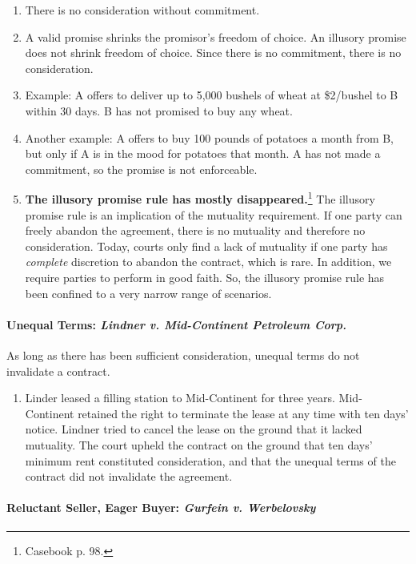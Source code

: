 \begin{enumerate}
    \item There is no consideration without commitment.
    \item A valid promise shrinks the promisor's freedom of choice. An 
    illusory promise does not shrink freedom of choice. Since there is no 
    commitment, there is no consideration.
    \item Example: A offers to deliver up to 5,000 bushels of wheat at 
    \$2/bushel to B within 30 days. B has not promised to buy any wheat.
    \item Another example: A offers to buy 100 pounds of potatoes a month from 
    B, but only if A is in the mood for potatoes that month. A has not made a 
    commitment, so the promise is not enforceable.
    \item \textbf{The illusory promise rule has mostly 
    disappeared.}\footnote{Casebook p. 98.} The illusory promise rule is an 
    implication of the mutuality requirement. If one party can freely abandon 
    the agreement, there is no mutuality and therefore no consideration. 
    Today, courts only find a lack of mutuality if one party has 
    \emph{complete} discretion to abandon the contract, which is rare. In 
    addition, we require parties to perform in good faith. So, the illusory 
    promise rule has been confined to a very narrow range of scenarios.
\end{enumerate}

\paragraph{Unequal Terms: \emph{Lindner v. Mid-Continent Petroleum Corp.}}

As long as there has been sufficient consideration, unequal terms do not 
invalidate a contract.

\begin{enumerate}
    \item Linder leased a filling station to Mid-Continent for three years. 
    Mid-Continent retained the right to terminate the lease at any time with 
    ten days' notice. Lindner tried to cancel the lease on the ground that it 
    lacked mutuality. The court upheld the contract on the ground that ten 
    days' minimum rent constituted consideration, and that the unequal terms 
    of the contract did not invalidate the agreement.
\end{enumerate}

\paragraph{Reluctant Seller, Eager Buyer: \emph{Gurfein v. Werbelovsky}}


